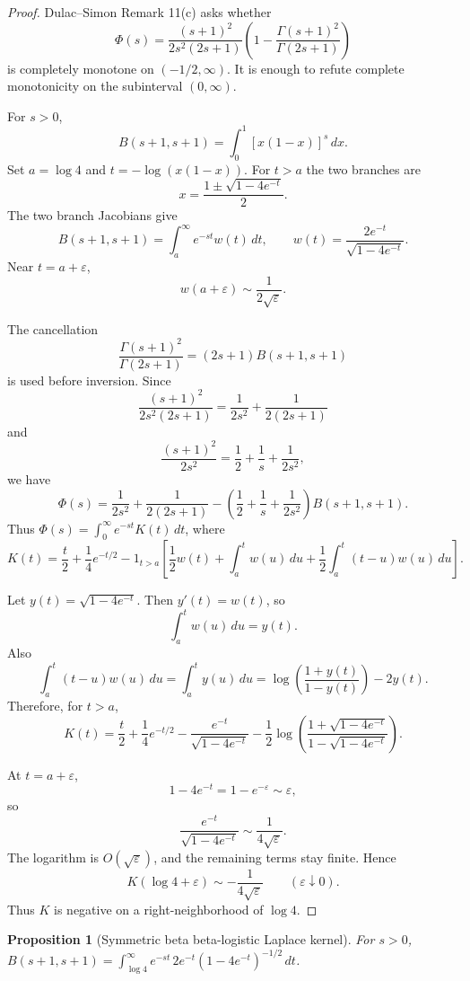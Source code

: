 \documentclass[11pt]{article}
\numberwithin{equation}{section}
\newtheorem{proposition}[theorem]{Proposition}
\theoremstyle{definition}
\theoremstyle{remark}
\newcommand{\1}{\mathbf 1}
\begin{document}
\begin{proof}
Dulac--Simon Remark 11(c) asks whether
\[
\Phi(s)=\frac{(s+1)^2}{2s^2(2s+1)}
\left(1-\frac{\Gamma(s+1)^2}{\Gamma(2s+1)}\right)
\]
is completely monotone on \((-1/2,\infty)\). It is enough to refute complete
monotonicity on the subinterval \((0,\infty)\).

For \(s>0\),
\[
B(s+1,s+1)=\int_0^1 [x(1-x)]^s\,dx .
\]
Set \(a=\log 4\) and \(t=-\log(x(1-x))\). For \(t>a\) the two branches are
\[
x=\frac{1\pm\sqrt{1-4e^{-t}}}{2}.
\]
The two branch Jacobians give
\[
B(s+1,s+1)
=\int_a^\infty e^{-st} w(t)\,dt,\qquad
w(t)=\frac{2e^{-t}}{\sqrt{1-4e^{-t}}}.
\]
Near \(t=a+\varepsilon\),
\[
w(a+\varepsilon)\sim \frac{1}{2\sqrt{\varepsilon}}.
\]

The cancellation
\[
\frac{\Gamma(s+1)^2}{\Gamma(2s+1)}
=(2s+1)B(s+1,s+1)
\]
is used before inversion. Since
\[
\frac{(s+1)^2}{2s^2(2s+1)}
=\frac{1}{2s^2}+\frac{1}{2(2s+1)}
\]
and
\[
\frac{(s+1)^2}{2s^2}
=\frac12+\frac1s+\frac{1}{2s^2},
\]
we have
\[
\Phi(s)=
\frac{1}{2s^2}+\frac{1}{2(2s+1)}
-\left(\frac12+\frac1s+\frac{1}{2s^2}\right)B(s+1,s+1).
\]
Thus \(\Phi(s)=\int_0^\infty e^{-st}K(t)\,dt\), where
\[
K(t)=\frac{t}{2}+\frac14e^{-t/2}
-1_{t>a}\left[
\frac12 w(t)+\int_a^t w(u)\,du
+\frac12\int_a^t(t-u)w(u)\,du
\right].
\]

Let \(y(t)=\sqrt{1-4e^{-t}}\). Then \(y'(t)=w(t)\), so
\[
\int_a^t w(u)\,du=y(t).
\]
Also
\[
\int_a^t(t-u)w(u)\,du
=\int_a^t y(u)\,du
=\log\left(\frac{1+y(t)}{1-y(t)}\right)-2y(t).
\]
Therefore, for \(t>a\),
\[
K(t)=\frac{t}{2}+\frac14e^{-t/2}
-\frac{e^{-t}}{\sqrt{1-4e^{-t}}}
-\frac12\log\left(\frac{1+\sqrt{1-4e^{-t}}}
{1-\sqrt{1-4e^{-t}}}\right).
\]

At \(t=a+\varepsilon\),
\[
1-4e^{-t}=1-e^{-\varepsilon}\sim\varepsilon,
\]
so
\[
\frac{e^{-t}}{\sqrt{1-4e^{-t}}}
\sim\frac{1}{4\sqrt{\varepsilon}}.
\]
The logarithm is \(O(\sqrt{\varepsilon})\), and the remaining terms stay finite.
Hence
\[
K(\log4+\varepsilon)
\sim -\frac{1}{4\sqrt{\varepsilon}}
\qquad(\varepsilon\downarrow0).
\]
Thus \(K\) is negative on a right-neighborhood of \(\log4\).
\end{proof}

\begin{proposition}[Symmetric beta beta-logistic Laplace kernel]
\label{res:symmetricbeta-betalogistic-laplacekernel}
For \(s>0\), \(B(s+1,s+1)=\int_{\log 4}^{\infty} e^{-st}\,2e^{-t}(1-4e^{-t})^{-1/2}\,dt\).
\end{proposition}
\end{document}
